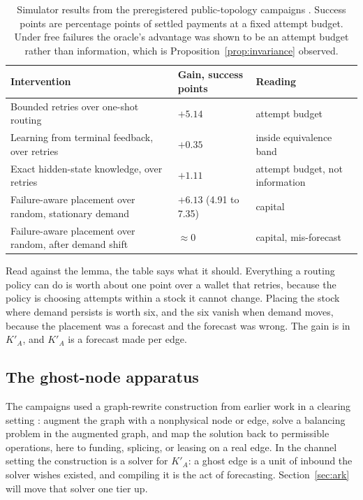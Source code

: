 \documentclass[11pt]{article}
\theoremstyle{plain}
\theoremstyle{definition}
\theoremstyle{remark}
\begin{document}
\begin{table}[t]
\centering
\small
\begin{tabular}{@{}>{\raggedright\arraybackslash}p{7.2cm}>{\raggedright\arraybackslash}p{3.2cm}>{\raggedright\arraybackslash}p{3.6cm}@{}}
\toprule
Intervention & Gain, success points & Reading \\
\midrule
Bounded retries over one-shot routing & $+5.14$ & attempt budget \\
Learning from terminal feedback, over retries & $+0.35$ & inside equivalence band \\
Exact hidden-state knowledge, over retries & $+1.11$ & attempt budget, not information \\
Failure-aware placement over random, stationary demand & $+6.13$ \;(4.91 to 7.35) & capital \\
Failure-aware placement over random, after demand shift & $\approx 0$ & capital, mis-forecast \\
\bottomrule
\end{tabular}
\caption{Simulator results from the preregistered public-topology campaigns \citep{spiral2026}. Success points are percentage points of settled payments at a fixed attempt budget. Under free failures the oracle's advantage was shown to be an attempt budget rather than information, which is Proposition~\ref{prop:invariance} observed.}
\label{tab:sim}
\end{table}

Read against the lemma, the table says what it should. Everything a routing policy can do is worth about one point over a wallet that retries, because the policy is choosing attempts within a stock it cannot change. Placing the stock where demand persists is worth six, and the six vanish when demand moves, because the placement was a forecast and the forecast was wrong. The gain is in $K'_A$, and $K'_A$ is a forecast made per edge.

\subsection{The ghost-node apparatus}

The campaigns used a graph-rewrite construction from earlier work in a clearing setting \citep{dugan2021ghost}: augment the graph with a nonphysical node or edge, solve a balancing problem in the augmented graph, and map the solution back to permissible operations, here to funding, splicing, or leasing on a real edge. In the channel setting the construction is a solver for $K'_A$: a ghost edge is a unit of inbound the solver wishes existed, and compiling it is the act of forecasting. Section~\ref{sec:ark} will move that solver one tier up.
\end{document}
